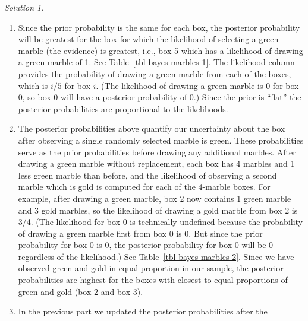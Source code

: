 \documentclass[
  letterpaper,
  DIV=11,
  numbers=noendperiod]{scrreprt}
\providecommand{\tightlist}{%
  \setlength{\itemsep}{0pt}\setlength{\parskip}{0pt}}
\theoremstyle{plain}
\theoremstyle{definition}
\theoremstyle{definition}
\theoremstyle{definition}
\theoremstyle{remark}
\newtheorem{refsolution}{Solution}[chapter]
\begin{document}
\begin{tcolorbox}[enhanced jigsaw, opacityback=0, rightrule=.15mm, coltitle=black, colframe=quarto-callout-tip-color-frame, toprule=.15mm, colbacktitle=quarto-callout-tip-color!10!white, opacitybacktitle=0.6, left=2mm, toptitle=1mm, breakable, title={Solution (click to expand)}, bottomtitle=1mm, colback=white, leftrule=.75mm, titlerule=0mm, arc=.35mm, bottomrule=.15mm]

\begin{refsolution}
\leavevmode

\begin{enumerate}
\def\labelenumi{\arabic{enumi}.}
\tightlist
\item
  Since the prior probability is the same for each box, the posterior
  probability will be greatest for the box for which the likelihood of
  selecting a green marble (the evidence) is greatest, i.e., box 5 which
  has a likelihood of drawing a green marble of 1. See
  Table~\ref{tbl-bayes-marbles-1}. The likelihood column provides the
  probability of drawing a green marble from each of the boxes, which is
  \(i/5\) for box \(i\). (The likelihood of drawing a green marble is 0
  for box 0, so box 0 will have a posterior probability of 0.) Since the
  prior is ``flat'' the posterior probabilities are proportional to the
  likelihoods.
\item
  The posterior probabilities above quantify our uncertainty about the
  box after observing a single randomly selected marble is green. These
  probabilities serve as the prior probabilities before drawing any
  additional marbles. After drawing a green marble without replacement,
  each box has 4 marbles and 1 less green marble than before, and the
  likelihood of observing a second marble which is gold is computed for
  each of the 4-marble boxes. For example, after drawing a green marble,
  box 2 now contains 1 green marble and 3 gold marbles, so the
  likelihood of drawing a gold marble from box 2 is 3/4. (The likelihood
  for box 0 is technically undefined because the probability of drawing
  a green marble first from box 0 is 0. But since the prior probability
  for box 0 is 0, the posterior probability for box 0 will be 0
  regardless of the likelihood.) See Table~\ref{tbl-bayes-marbles-2}.
  Since we have observed green and gold in equal proportion in our
  sample, the posterior probabilities are highest for the boxes with
  closest to equal proportions of green and gold (box 2 and box 3).
\item
  In the previous part we updated the posterior probabilities after the

\end{enumerate}
\end{refsolution}
\end{tcolorbox}
\end{document}
